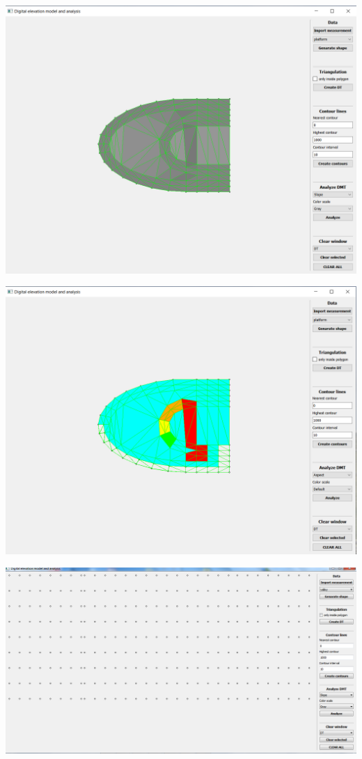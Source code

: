 \documentclass[12pt]{article}
\begin{document}
\begin{center}
   \includegraphics[width=14cm]{./img/platform_slope.png}
\end{center}

\begin{center}
   \includegraphics[width=14cm]{./img/platform_aspect.png}
\end{center}


\begin{center}
   \includegraphics[width=14cm]{./img/valley.png}
\end{center}
\end{document}
